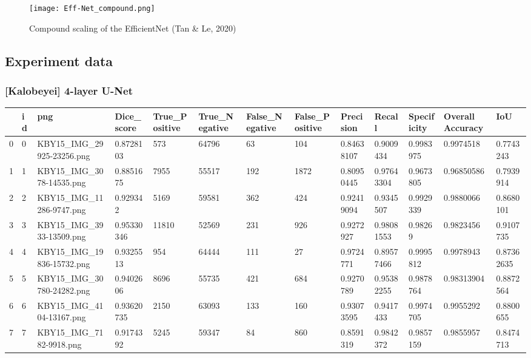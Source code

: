 \documentclass[11pt, a4paper, twoside]{report}
\begin{document}
\begin{figure}[H]
  \centering
  \texttt{[image: Eff-Net\_compound.png]}
  \caption{Compound scaling of the EfficientNet (Tan \& Le, 2020)}
  \label{app:EfficientNet}
\end{figure}

\newpage

\subsection{Experiment data}\label{fulldata}

\subsubsection{[Kalobeyei] 4-layer U-Net}

\begin{longtable}[c]{@{}lllllllllllll@{}}
\tiny
\toprule
 & id & png & Dice\_score & True\_Positive & True\_Negative & False\_Negative & False\_Positive & Precision & Recall & Specificity & Overall Accuracy & IoU \\* \midrule
\endhead
%
\bottomrule
\endfoot
%
\endlastfoot
%
0 & 0 & KBY15\_IMG\_29925-23256.png & 0.8728103 & 573 & 64796 & 63 & 104 & 0.84638107 & 0.9009434 & 0.9983975 & 0.9974518 & 0.7743243 \\
1 & 1 & KBY15\_IMG\_3078-14535.png & 0.8851675 & 7955 & 55517 & 192 & 1872 & 0.80950445 & 0.97643304 & 0.9673805 & 0.96850586 & 0.7939914 \\
2 & 2 & KBY15\_IMG\_11286-9747.png & 0.929342 & 5169 & 59581 & 362 & 424 & 0.92419094 & 0.9345507 & 0.9929339 & 0.9880066 & 0.8680101 \\
3 & 3 & KBY15\_IMG\_3933-13509.png & 0.95330346 & 11810 & 52569 & 231 & 926 & 0.9272927 & 0.98081553 & 0.98269 & 0.9823456 & 0.9107735 \\
4 & 4 & KBY15\_IMG\_19836-15732.png & 0.9325513 & 954 & 64444 & 111 & 27 & 0.9724771 & 0.89577466 & 0.9995812 & 0.9978943 & 0.87362635 \\
5 & 5 & KBY15\_IMG\_30780-24282.png & 0.9402606 & 8696 & 55735 & 421 & 684 & 0.9270789 & 0.95382255 & 0.9878764 & 0.98313904 & 0.8872564 \\
6 & 6 & KBY15\_IMG\_4104-13167.png & 0.93620735 & 2150 & 63093 & 133 & 160 & 0.93073595 & 0.9417433 & 0.9974705 & 0.9955292 & 0.8800655 \\
7 & 7 & KBY15\_IMG\_7182-9918.png & 0.9174392 & 5245 & 59347 & 84 & 860 & 0.8591319 & 0.9842372 & 0.9857159 & 0.9855957 & 0.8474713 \\

\end{longtable}
\end{document}
